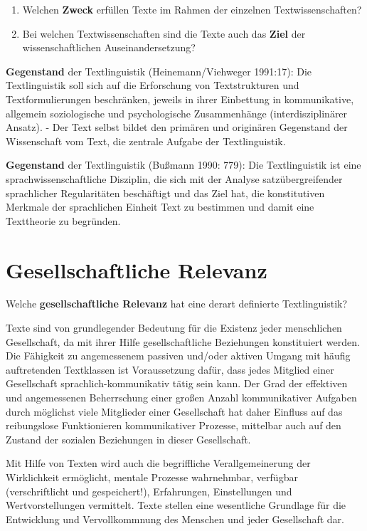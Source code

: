 \documentclass[
  letterpaper,
  DIV=11,
  numbers=noendperiod]{scrreprt}
\providecommand{\tightlist}{%
  \setlength{\itemsep}{0pt}\setlength{\parskip}{0pt}}\usepackage{longtable,booktabs,array}
\begin{document}
\begin{enumerate}
\def\labelenumi{\arabic{enumi}.}
\tightlist
\item
  Welchen \textbf{Zweck} erfüllen Texte im Rahmen der einzelnen
  Textwissenschaften?\\
\item
  Bei welchen Textwissenschaften sind die Texte auch das \textbf{Ziel}
  der wissenschaftlichen Auseinandersetzung?
\end{enumerate}

\textbf{Gegenstand} der Textlinguistik (Heinemann/Viehweger 1991:17):
Die Textlinguistik soll sich auf die Erforschung von Textstrukturen und
Textformulierungen beschränken, jeweils in ihrer Einbettung in
kommunikative, allgemein soziologische und psychologische Zusammenhänge
(interdisziplinärer Ansatz). - Der Text selbst bildet den primären und
originären Gegenstand der Wissenschaft vom Text, die zentrale Aufgabe
der Textlinguistik.

\textbf{Gegenstand} der Textlinguistik (Bußmann 1990: 779): Die
Textlinguistik ist eine sprachwissenschaftliche Disziplin, die sich mit
der Analyse satzübergreifender sprachlicher Regularitäten beschäftigt
und das Ziel hat, die konstitutiven Merkmale der sprachlichen Einheit
Text zu bestimmen und damit eine Texttheorie zu begründen.

\hypertarget{gesellschaftliche-relevanz}{%
\section{Gesellschaftliche Relevanz}\label{gesellschaftliche-relevanz}}

Welche \textbf{gesellschaftliche Relevanz} hat eine derart definierte
Textlinguistik?

Texte sind von grundlegender Bedeutung für die Existenz jeder
menschlichen Gesellschaft, da mit ihrer Hilfe gesellschaftliche
Beziehungen konstituiert werden. Die Fähigkeit zu angemessenem passiven
und/oder aktiven Umgang mit häufig auftretenden Textklassen ist
Voraussetzung dafür, dass jedes Mitglied einer Gesellschaft
sprachlich-kommunikativ tätig sein kann. Der Grad der effektiven und
angemessenen Beherrschung einer großen Anzahl kommunikativer Aufgaben
durch möglichst viele Mitglieder einer Gesellschaft hat daher Einfluss
auf das reibungslose Funktionieren kommunikativer Prozesse, mittelbar
auch auf den Zustand der sozialen Beziehungen in dieser Gesellschaft.

Mit Hilfe von Texten wird auch die begriffliche Verallgemeinerung der
Wirklichkeit ermöglicht, mentale Prozesse wahrnehmbar, verfügbar
(verschriftlicht und gespeichert!), Erfahrungen, Einstellungen und
Wertvorstellungen vermittelt. Texte stellen eine wesentliche Grundlage
für die Entwicklung und Vervollkommnung des Menschen und jeder
Gesellschaft dar.
\end{document}
